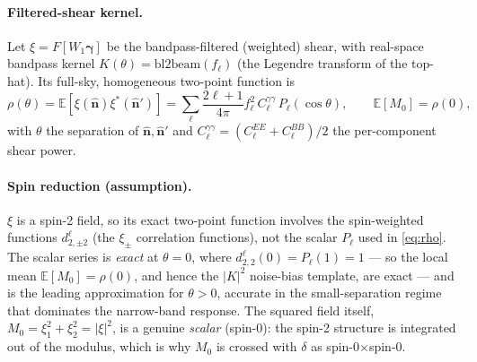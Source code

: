 \documentclass[11pt]{article}
\newcommand{\nv}{\hat{\boldsymbol{n}}}
\newcommand{\E}{\mathbb{E}}
\newcommand{\Wone}{W_1}
\newcommand{\dt}{\delta}
\begin{document}
\paragraph{Filtered-shear kernel.}
Let $\xi=F[\Wone\bm\gamma]$ be the bandpass-filtered (weighted) shear, with
real-space bandpass kernel $K(\theta)=\mathrm{bl2beam}(f_\ell)$ (the Legendre
transform of the top-hat). Its full-sky, homogeneous two-point function is
\begin{equation}
\rho(\theta)=\E[\xi(\nv)\xi^*(\nv')]
=\sum_\ell\frac{2\ell+1}{4\pi}f_\ell^2\,C^{\gamma\gamma}_\ell\,P_\ell(\cos\theta),
\qquad \E[M_0]=\rho(0),
\label{eq:rho}
\end{equation}
with $\theta$ the separation of $\nv,\nv'$ and $C^{\gamma\gamma}_\ell=
(C^{EE}_\ell+C^{BB}_\ell)/2$ the per-component shear power.

\paragraph{Spin reduction (assumption).}
$\xi$ is a spin-2 field, so its exact two-point function involves the
spin-weighted functions $d^\ell_{2,\pm2}$ (the $\xi_\pm$ correlation functions),
not the scalar $P_\ell$ used in \cref{eq:rho}. The scalar series is
\emph{exact} at $\theta=0$, where $d^\ell_{2,2}(0)=P_\ell(1)=1$ --- so the local
mean $\E[M_0]=\rho(0)$, and hence the $|K|^2$ noise-bias template, are exact ---
and is the leading approximation for $\theta>0$, accurate in the
small-separation regime that dominates the narrow-band response. The squared
field itself, $M_0=\xi_1^2+\xi_2^2=|\xi|^2$, is a genuine \emph{scalar} (spin-0):
the spin-2 structure is integrated out of the modulus, which is why $M_0$ is
crossed with $\dt$ as spin-0$\times$spin-0.
\end{document}
